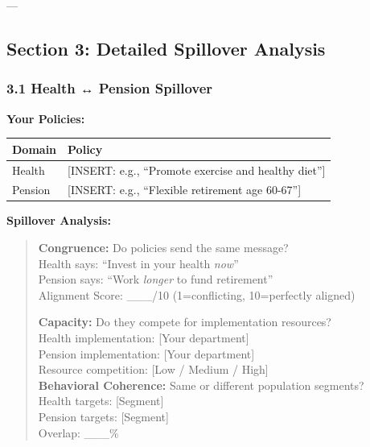 ---


\subsection*{Section 3: Detailed Spillover Analysis}

\subsubsection*{3.1 Health ↔ Pension Spillover}

\textbf{Your Policies:}
\begin{center}
\begin{tabular}{@{}ll@{}}
\toprule
\textbf{Domain} & \textbf{Policy} \\
\midrule
Health & [INSERT: e.g., ``Promote exercise and healthy diet''] \\
Pension & [INSERT: e.g., ``Flexible retirement age 60-67''] \\
\midrule
\end{tabular}
\end{center}

\textbf{Spillover Analysis:}

\begin{quote}
\textbf{Congruence:} Do policies send the same message? \\
Health says: ``Invest in your health \textit{now}'' \\
Pension says: ``Work \textit{longer} to fund retirement'' \\
Alignment Score: \_\_\_/10 (1=conflicting, 10=perfectly aligned)

\textbf{Capacity:} Do they compete for implementation resources? \\
Health implementation: [Your department] \\
Pension implementation: [Your department] \\
Resource competition: [Low / Medium / High] \\

\textbf{Behavioral Coherence:} Same or different population segments? \\
Health targets: [Segment] \\
Pension targets: [Segment] \\
Overlap: \_\_\_\%
\end{quote}

